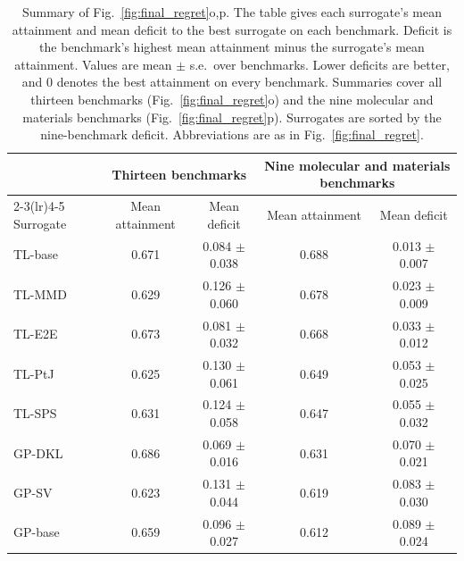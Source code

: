 \begin{table}[p]
\centering
\scriptsize
\caption{Summary of Fig.~\ref{fig:final_regret}o,p. The table gives each surrogate's mean attainment and mean deficit to the best surrogate on each benchmark. Deficit is the benchmark's highest mean attainment minus the surrogate's mean attainment. Values are mean $\pm$ s.e.\ over benchmarks. Lower deficits are better, and 0 denotes the best attainment on every benchmark. Summaries cover all thirteen benchmarks (Fig.~\ref{fig:final_regret}o) and the nine molecular and materials benchmarks (Fig.~\ref{fig:final_regret}p). Surrogates are sorted by the nine-benchmark deficit. Abbreviations are as in Fig.~\ref{fig:final_regret}.}
\label{supptab:fig1_summary}
\begin{tabular}{@{}l cc cc@{}}
\toprule
& \multicolumn{2}{c}{Thirteen benchmarks} & \multicolumn{2}{c}{Nine molecular and materials benchmarks} \\
\cmidrule(lr){2-3}\cmidrule(lr){4-5}
Surrogate & Mean attainment & Mean deficit & Mean attainment & Mean deficit \\
\midrule
TL-base & 0.671 & 0.084 $\pm$ 0.038 & 0.688 & 0.013 $\pm$ 0.007 \\
TL-MMD & 0.629 & 0.126 $\pm$ 0.060 & 0.678 & 0.023 $\pm$ 0.009 \\
TL-E2E & 0.673 & 0.081 $\pm$ 0.032 & 0.668 & 0.033 $\pm$ 0.012 \\
TL-PtJ & 0.625 & 0.130 $\pm$ 0.061 & 0.649 & 0.053 $\pm$ 0.025 \\
TL-SPS & 0.631 & 0.124 $\pm$ 0.058 & 0.647 & 0.055 $\pm$ 0.032 \\
GP-DKL & 0.686 & 0.069 $\pm$ 0.016 & 0.631 & 0.070 $\pm$ 0.021 \\
GP-SV & 0.623 & 0.131 $\pm$ 0.044 & 0.619 & 0.083 $\pm$ 0.030 \\
GP-base & 0.659 & 0.096 $\pm$ 0.027 & 0.612 & 0.089 $\pm$ 0.024 \\
\bottomrule
\end{tabular}
\end{table}



